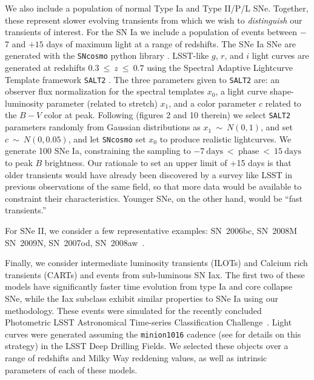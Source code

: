 \documentclass[letterpaper,longauthor,trackchanges,twocolumn,onecolappendix,sort&compress]{aastex62}
\newcommand\rahul[1]{\textcolor{blue}{#1}}
\begin{document}
We also include a population of normal Type Ia and Type II/P/L SNe. Together, these represent slower evolving transients from which we wish to \emph{distinguish} our transients of interest. For the SN Ia we include a population of events between $-$7 and $+15$ days of maximum light at a range of redshifts. The SNe Ia SNe are generated with the {\tt SNcosmo} python library \citep{sncosmo}. LSST-like $g$, $r$, and $i$ light curves are generated at redshifts $0.3~\leq~z~\leq~0.7$ using the Spectral Adaptive Lightcurve Template framework {\tt SALT2} \citep[][a light curve fitting model]{salt2}. The three parameters given to {\tt SALT2} are: an observer flux normalization for the spectral templates $x_0$, a light curve shape-luminosity parameter (related to stretch) $x_1$,  and a color parameter $c$ related to the $B - V$ color at peak. Following \citealt{Kessler2010} (figures 2 and 10 therein) we select {\tt SALT2} parameters randomly from Gaussian distributions as $x_1~\sim~N(0,1)$, and set $c~\sim~N(0,0.05)$, and let {\tt SNcosmo} set $x_0$ to produce realistic lightcurves. We generate 100 SNe Ia, constraining the sampling to $-7~\mathrm{days}~<~\mathrm{phase}~<~15~\mathrm{days}$ to peak $B$ brightness. Our rationale to set an upper limit of +15 days is that older transients would have already been discovered by a survey like LSST in previous observations of the same field, so that more data would be available to constraint their characteristics.  Younger SNe, on the other hand, would be ``fast transients.''

For SNe II, we consider a few representative examples: SN~2006bc, SN~2008M SN~2009N, SN~2007od, SN~2008aw~\citep[personal communication]{sncsp}. 


Finally, we consider intermediate luminosity transients (ILOTs) and Calcium rich transients (CARTs) and events from sub-luminous SN Iax. The first two of these models have significantly faster time evolution from type Ia and core collapse SNe, while the Iax subclass exhibit similar properties to SNe Ia using our methodology. These events were simulated for the recently concluded Photometric LSST Astronomical Time-series Classification Challenge~\citep[PLAsTiCC,][]{plasticc}. Light curves were generated assuming the \texttt{minion1016} cadence (see \citealt{COSEP} for details on this strategy)  in the LSST Deep Drilling Fields. We selected these objects over a range of redshifts and Milky Way reddening values, as well as intrinsic parameters of each of these models. 
\end{document}
